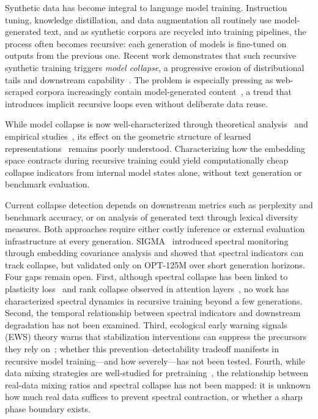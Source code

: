
Synthetic data has become integral to language model training.
Instruction tuning, knowledge distillation, and data augmentation all routinely use model-generated text, and as synthetic corpora are recycled into training pipelines, the process often becomes recursive: each generation of models is fine-tuned on outputs from the previous one.
Recent work demonstrates that such recursive synthetic training triggers \textit{model collapse}, a progressive erosion of distributional tails and downstream capability~\citep{shumailov2024collapse, dohmatob2024tails, dohmatob2024demystified, alemohammad2024mad}.
The problem is especially pressing as web-scraped corpora increasingly contain model-generated content~\citep{dohmatob2025strong}, a trend that introduces implicit recursive loops even without deliberate data reuse.

While model collapse is now well-characterized through theoretical analysis~\citep{dohmatob2024tails, seddik2024synthetic} and empirical studies~\citep{shumailov2024collapse, alemohammad2024mad, gerstgrasser2024inevitable}, its effect on the geometric structure of learned representations~\citep{ethayarajh2019contextual, martin2021implicit} remains poorly understood.
Characterizing how the embedding space contracts during recursive training could yield computationally cheap collapse indicators from internal model states alone, without text generation or benchmark evaluation.

Current collapse detection depends on downstream metrics such as perplexity and benchmark accuracy, or on analysis of generated text through lexical diversity measures.
Both approaches require either costly inference or external evaluation infrastructure at every generation.
SIGMA~\citep{gu2026sigma} introduced spectral monitoring through embedding covariance analysis and showed that spectral indicators can track collapse, but validated only on OPT-125M over short generation horizons.
Four gaps remain open.
First, although spectral collapse has been linked to plasticity loss~\citep{he2025spectral} and rank collapse observed in attention layers~\citep{naderi2025mindgap}, no work has characterized spectral dynamics in recursive training beyond a few generations.
Second, the temporal relationship between spectral indicators and downstream degradation has not been examined.
Third, ecological early warning signals (EWS) theory warns that stabilization interventions can suppress the precursors they rely on~\citep{scheffer2009ews, scheffer2012anticipating}; whether this prevention--detectability tradeoff manifests in recursive model training---and how severely---has not been tested.
Fourth, while data mixing strategies are well-studied for pretraining~\citep{longpre2024pretrainer, xie2023doremi}, the relationship between real-data mixing ratios and spectral collapse has not been mapped: it is unknown how much real data suffices to prevent spectral contraction, or whether a sharp phase boundary exists.

